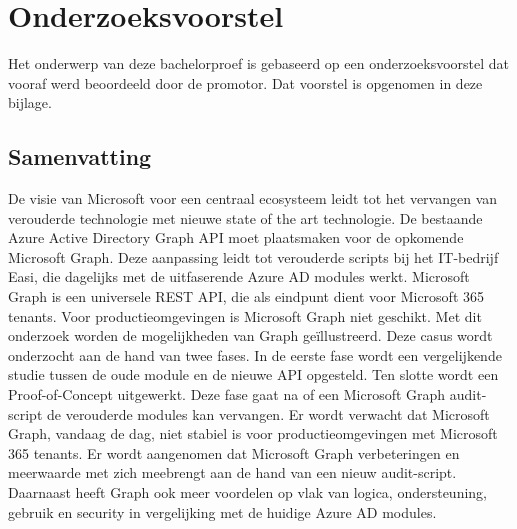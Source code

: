 \documentclass[dutch,dit,thesis]{hogentreport}
\begin{document}
\mainmatter{}












\appendix

\chapter{Onderzoeksvoorstel}

Het onderwerp van deze bachelorproef is gebaseerd op een onderzoeksvoorstel dat vooraf werd beoordeeld door de promotor. Dat voorstel is opgenomen in deze bijlage.

\section*{Samenvatting}

De visie van Microsoft voor een centraal ecosysteem leidt tot het vervangen van verouderde technologie met nieuwe state of the art technologie. De bestaande Azure Active Directory Graph API moet plaatsmaken voor de opkomende Microsoft Graph. Deze aanpassing leidt tot verouderde scripts bij het IT-bedrijf Easi, die dagelijks met de uitfaserende Azure AD modules werkt. Microsoft Graph is een universele REST API, die als eindpunt dient voor Microsoft 365 tenants. Voor productieomgevingen is Microsoft Graph niet geschikt. Met dit onderzoek worden de mogelijkheden van Graph geïllustreerd. Deze casus wordt onderzocht aan de hand van twee fases. In de eerste fase wordt een vergelijkende studie tussen de oude module en de nieuwe API opgesteld. Ten slotte wordt een Proof-of-Concept uitgewerkt. Deze fase gaat na of een Microsoft Graph audit-script de verouderde modules kan vervangen. Er wordt verwacht dat Microsoft Graph, vandaag de dag, niet stabiel is voor productieomgevingen met Microsoft 365 tenants. Er wordt aangenomen dat Microsoft Graph verbeteringen en meerwaarde met zich meebrengt aan de hand van een nieuw audit-script. Daarnaast heeft Graph ook meer voordelen op vlak van logica, ondersteuning, gebruik en security in vergelijking met de huidige Azure AD modules.
\end{document}
